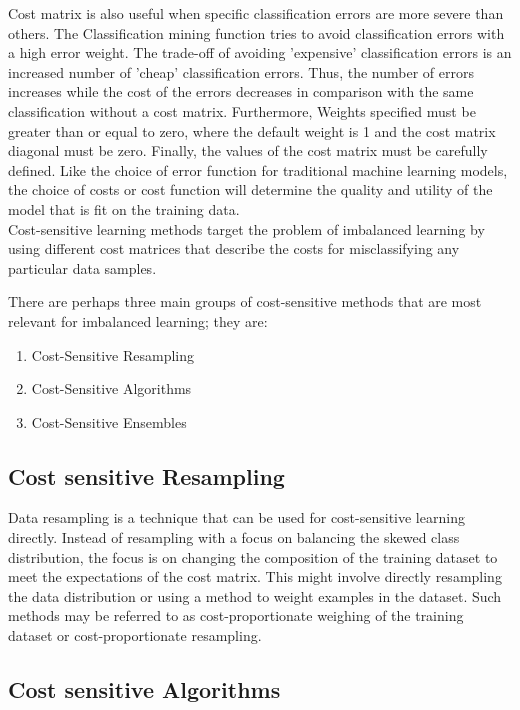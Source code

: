 Cost matrix is also useful when specific classification errors are more severe than others. The Classification mining function tries to avoid classification errors with a high error weight. The trade-off of avoiding 'expensive' classification errors is an increased number of 'cheap' classification errors. Thus, the number of errors increases while the cost of the errors decreases in comparison with the same classification without a cost matrix.
Furthermore, Weights specified must be greater than or equal to zero, where the default weight is 1 and the cost matrix diagonal must be zero.
Finally, the values of the cost matrix must be carefully defined. Like the choice of error function for traditional machine learning models, the choice of costs or cost function will determine the quality and utility of the model that is fit on the training data.\\

Cost-sensitive learning methods target the problem of imbalanced learning by using different cost matrices that describe the costs for misclassifying any particular data samples.

There are perhaps three main groups of cost-sensitive methods that are most relevant for imbalanced learning; they are: 
\begin{enumerate}
\item{ Cost-Sensitive Resampling} 
\item{ Cost-Sensitive Algorithms}   
\item{ Cost-Sensitive Ensembles}  
\end{enumerate}

\subsection{Cost sensitive Resampling}
Data resampling is a technique that can be used for cost-sensitive learning directly. Instead of resampling with a focus on balancing the skewed class distribution, the focus is on changing the composition of the training dataset to meet the expectations of the cost matrix.
This might involve directly resampling the data distribution or using a method to weight examples in the dataset. Such methods may be referred to as cost-proportionate weighing of the training dataset or cost-proportionate resampling. \\


\subsection{Cost sensitive Algorithms}

